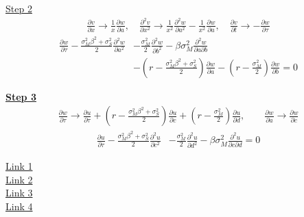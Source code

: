 \documentclass[12pt]{article}
\newenvironment{solution}[2][Solution]{\begin{trivlist}
\item[\hskip \labelsep {\bfseries #1}\hskip \labelsep {\bfseries #2.}]}{\end{trivlist}}
\begin{document}
\begin{solution}[Solution]
\textbf{\underline{Step 2}}
\begin{align*}
\frac{\partial v}{\partial x} \to \frac{1}{x}\frac{\partial w}{\partial a},\quad
\frac{\partial^2 v}{\partial x^2} \to \frac{1}{x^2}\frac{\partial^2 w}{\partial a^2} - \frac{1}{x^2}\frac{\partial w}{\partial a},\quad
\frac{\partial v}{\partial t} \to -\frac{\partial w}{\partial \tau}
\end{align*}
\begin{align*}
    \frac{\partial w}{\partial \tau}
    -\frac{\sigma_M^2 \beta^2 +\sigma_S^2}{2} \frac{\partial^2 w}{\partial a^2}
    &-\frac{\sigma_M^2}{2} \frac{\partial^2 w}{\partial b^2}
    -\beta\sigma_M^2 \frac{\partial^2 w}{\partial a \partial b}\\
    &-\left(r-\frac{\sigma_M^2 \beta^2 +\sigma_S^2}{2}\right)\frac{\partial w}{\partial a}
    -\left(r-\frac{\sigma_M^2}{2}\right)\frac{\partial w}{\partial b}
    = 0
\end{align*}


\textbf{\underline{Step 3}}
\begin{align*}
\frac{\partial w}{\partial \tau}
\to \frac{\partial u}{\partial \tau}
+\left(r-\frac{\sigma_M^2 \beta^2 +\sigma_S^2}{2}\right)\frac{\partial u}{\partial c}
+\left(r-\frac{\sigma_M^2}{2}\right)\frac{\partial u}{\partial d}, \qquad
\frac{\partial w}{\partial a} \to \frac{\partial w}{\partial c}
\end{align*}
\begin{align*}
    \frac{\partial u}{\partial \tau}
    -\frac{\sigma_M^2 \beta^2 +\sigma_S^2}{2} \frac{\partial^2 u}{\partial c^2}
    &-\frac{\sigma_M^2}{2} \frac{\partial^2 u}{\partial d^2}
    -\beta\sigma_M^2 \frac{\partial^2 u}{\partial c \partial d}
    = 0
\end{align*}

\href{https://quant.stackexchange.com/questions/38248/black-scholes-pde-change-of-variables}{Link 1}\\
\href{https://quant.stackexchange.com/questions/84/transformation-from-the-black-scholes-differential-equation-to-the-diffusion-equ}{Link 2}\\
\href{https://math.stackexchange.com/questions/2670875/change-of-variables-in-black-and-scholes-equation}{Link 3}\\
\href{http://www.math.tamu.edu/~stecher/425/Sp12/blackScholesHeatEquation.pdf}{Link 4}


\end{solution}
\end{document}
